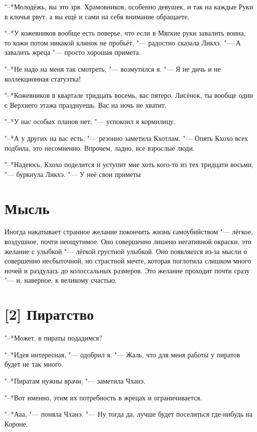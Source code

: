 "--*Молодёжь, вы это зря.
Храмовников, особенно девушек, и так на каждые Руки в клочья рвут, а вы ещё и сами на себя внимание обращаете.

"--*У кожевников вообще есть поверье, что если в Мягкие руки завалить воина, то кожи потом никакой клинок не пробьёт, "--- радостно сказала Ликхэ.
"--- А завалить жреца "--- просто хорошая примета.

"--*Не надо на меня так смотреть, "--- возмутился я.
"--- Я не дичь и не коллекционная статуэтка!

"--*Кожевников в квартале тридцать восемь, вас пятеро.
Лисёнок, ты вообще один с Верхнего этажа празднуешь.
Вас на ночь не хватит.

"--*У нас особых планов нет, "--- успокоил я кормилицу.

"--*А у других на вас есть, "--- резонно заметила Кхотлам.
"--- Опять Кхохо всех подбила, это несомненно.
Впрочем, ладно, все взрослые люди.

"--*Надеюсь, Кхохо поделится и уступит мне хоть кого-то из тех тридцати восьми, "--- буркнула Ликхэ.
"--- У неё свои приметы\ldotst

\section{Мысль}

Иногда накатывает странное желание покончить жизнь самоубийством "--- лёгкое, воздушное, почти неощутимое.
Оно совершенно лишено негативной окраски, это желание с улыбкой "--- лёгкой грустной улыбкой.
Оно появляется из-за мысли о совершенно несбыточной, но страстной мечте, которая поглотила слишком много ночей и раздулась до колоссальных размеров.
Это желание проходит почти сразу "--- и, наверное, к великому счастью.

\section{[2] Пиратство}

"--*Может, в пираты подадимся?

"--*Идея интересная, "--- одобрил я.
"--- Жаль, что для меня работы у пиратов будет не так много.

"--*Пиратам нужны врачи, "--- заметила Чханэ.

"--*Вот именно, этим их потребность в жрецах и ограничивается.

"--*Ааа, "--- поняла Чханэ.
"--- Ну тогда да, лучше будет поселиться где-нибудь на Короне.

